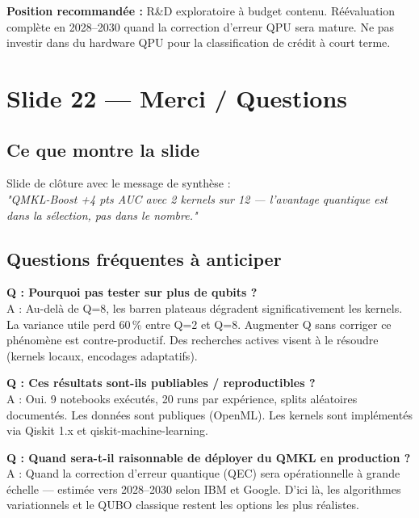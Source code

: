 \documentclass[12pt, a4paper]{article}
\begin{document}
\begin{retenir}
\textbf{Position recommandée :} R\&D exploratoire à budget contenu.
Réévaluation complète en 2028--2030 quand la correction d'erreur QPU sera mature.
Ne pas investir dans du hardware QPU pour la classification de crédit à court terme.
\end{retenir}

\section{Slide 22 — Merci / Questions}

\subsection*{Ce que montre la slide}

Slide de clôture avec le message de synthèse : \\
\emph{"QMKL-Boost +4 pts AUC avec 2 kernels sur 12 — l'avantage quantique est dans la sélection, pas dans le nombre."}

\subsection*{Questions fréquentes à anticiper}

\begin{question}
\textbf{Q : Pourquoi pas tester sur plus de qubits ?}\\
A : Au-delà de Q=8, les barren plateaus dégradent significativement les kernels.
La variance utile perd 60\,\% entre Q=2 et Q=8. Augmenter Q sans corriger ce phénomène
est contre-productif. Des recherches actives visent à le résoudre (kernels locaux, encodages adaptatifs).
\end{question}

\begin{question}
\textbf{Q : Ces résultats sont-ils publiables / reproductibles ?}\\
A : Oui. 9 notebooks exécutés, 20 runs par expérience, splits aléatoires documentés.
Les données sont publiques (OpenML). Les kernels sont implémentés via Qiskit 1.x
et qiskit-machine-learning.
\end{question}

\begin{question}
\textbf{Q : Quand sera-t-il raisonnable de déployer du QMKL en production ?}\\
A : Quand la correction d'erreur quantique (QEC) sera opérationnelle à grande échelle
— estimée vers 2028--2030 selon IBM et Google. D'ici là, les algorithmes variationnels
et le QUBO classique restent les options les plus réalistes.
\end{question}
\end{document}
